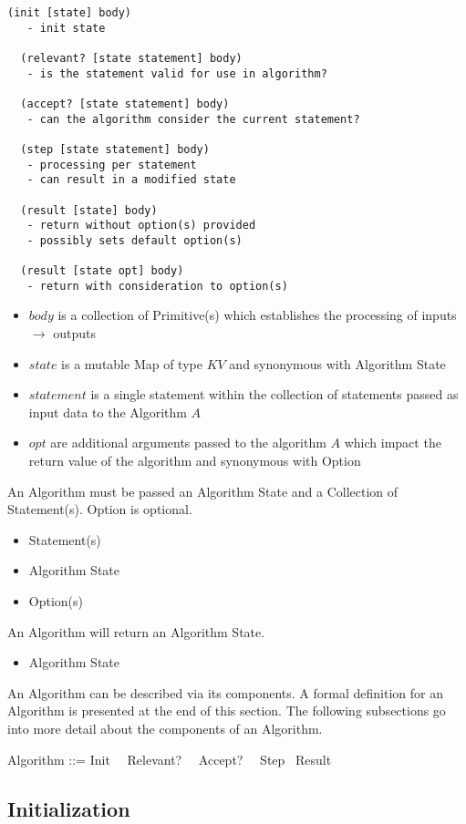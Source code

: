 \documentclass[../main.tex]{subfiles}
\begin{document}
\begin{lstlisting}[frame=single]
  (init [state] body)
   - init state

  (relevant? [state statement] body)
   - is the statement valid for use in algorithm?

  (accept? [state statement] body)
   - can the algorithm consider the current statement?

  (step [state statement] body)
   - processing per statement
   - can result in a modified state

  (result [state] body)
   - return without option(s) provided
   - possibly sets default option(s)

  (result [state opt] body)
   - return with consideration to option(s)
\end{lstlisting}
\begin{itemize}
\item $body$ is a collection of Primitive(s) which establishes the processing of inputs $\to$ outputs
\item $state$ is a mutable Map of type $KV$ and synonymous with Algorithm State
\item $statement$ is a single statement within the collection of statements passed as input data to the Algorithm $A$
\item $opt$ are additional arguments passed to the algorithm $A$ which impact the return value of the algorithm and synonymous with Option
\end{itemize}
An Algorithm must be passed an Algorithm State and a Collection of Statement(s). Option is optional.
\begin{itemize}
\item Statement(s)
\item Algorithm State
\item Option(s)
\end{itemize}
An Algorithm will return an Algorithm State.
\begin{itemize}
\item Algorithm State
\end{itemize}
An Algorithm can be described via its components. A formal definition for an Algorithm
is presented at the end of this section. The following subsections go into more detail about the components of an Algorithm.
\begin{zed}
  Algorithm ::= Init ~\pipe ~Relevant? ~\pipe ~Accept? ~\pipe ~Step ~\pipe Result
\end{zed}
\subsection{Initialization}
\end{document}

